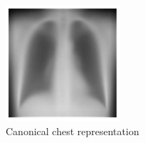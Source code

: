 \documentclass{article}
\begin{document}
\begin{figure}[ht]\label{canonical_chest}
    \vskip 0.2in
    \begin{center}
    \centerline{\includegraphics[width=\columnwidth/2]{../images/canonical_chest.png}}
    \caption{Canonical chest representation}
    \end{center}
    \vskip -0.2in
\end{figure}
\end{document}

